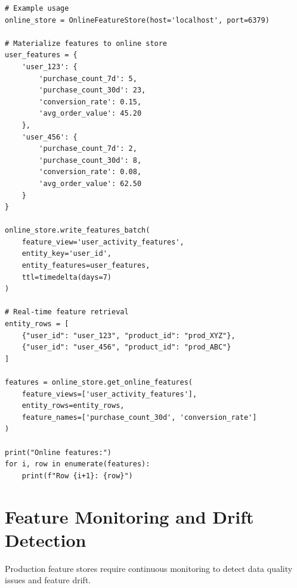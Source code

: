 \begin{lstlisting}[style=python, caption=Low-latency online feature store implementation]
# Example usage
online_store = OnlineFeatureStore(host='localhost', port=6379)

# Materialize features to online store
user_features = {
    'user_123': {
        'purchase_count_7d': 5,
        'purchase_count_30d': 23,
        'conversion_rate': 0.15,
        'avg_order_value': 45.20
    },
    'user_456': {
        'purchase_count_7d': 2,
        'purchase_count_30d': 8,
        'conversion_rate': 0.08,
        'avg_order_value': 62.50
    }
}

online_store.write_features_batch(
    feature_view='user_activity_features',
    entity_key='user_id',
    entity_features=user_features,
    ttl=timedelta(days=7)
)

# Real-time feature retrieval
entity_rows = [
    {"user_id": "user_123", "product_id": "prod_XYZ"},
    {"user_id": "user_456", "product_id": "prod_ABC"}
]

features = online_store.get_online_features(
    feature_views=['user_activity_features'],
    entity_rows=entity_rows,
    feature_names=['purchase_count_30d', 'conversion_rate']
)

print("Online features:")
for i, row in enumerate(features):
    print(f"Row {i+1}: {row}")
\end{lstlisting}

\section{Feature Monitoring and Drift Detection}

Production feature stores require continuous monitoring to detect data quality issues and feature drift.

